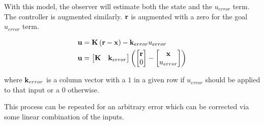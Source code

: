 With this model, the observer will estimate both the state and the $u_{error}$
term. The controller is augmented similarly. $\mathbf{r}$ is augmented with a zero
for the goal $u_{error}$ term.

\begin{align*}
  \mathbf{u} &= \mathbf{K} \left(\mathbf{r} - \mathbf{x}\right) - \mathbf{k}_{error}u_{error}
    \\
  \mathbf{u} &=
  \begin{bmatrix}
    \mathbf{K} & \mathbf{k}_{error}
  \end{bmatrix}
  \left(\begin{bmatrix}
    \mathbf{r} \\
    0
  \end{bmatrix} -
  \begin{bmatrix}
    \mathbf{x} \\
    u_{error}
  \end{bmatrix}\right)
\end{align*}

where $\mathbf{k}_{error}$ is a column vector with a $1$ in a given row if
$u_{error}$ should be applied to that input or a $0$ otherwise.

This process can be repeated for an arbitrary error which can be corrected via
some linear combination of the inputs.
